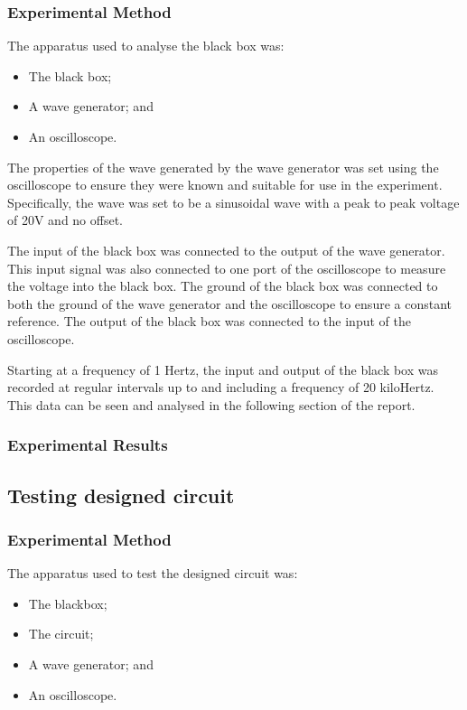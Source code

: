 \documentclass[12pt]{article} %
\begin{document}
\subsubsection{Experimental Method}

The apparatus used to analyse the black box was:
\begin{itemize} \itemsep1pt
	\item The black box;
	\item A wave generator; and
	\item An oscilloscope.
\end{itemize}


The properties of the wave generated by the wave generator was set using the oscilloscope to ensure they were known and suitable for use in the experiment. Specifically, the wave was set to be a sinusoidal wave with a peak to peak voltage of 20V and no offset.

The input of the black box was connected to the output of the wave generator. This input signal was also connected to one port of the oscilloscope to measure the voltage into the black box. The ground of the black box was connected to both the ground of the wave generator and the oscilloscope to ensure a constant reference. The output of the black box was connected to the input of the oscilloscope. 

Starting at a frequency of 1 Hertz, the input and output of the black box was recorded at regular intervals up to and including a frequency of 20 kiloHertz. This data can be seen and analysed in the following section of the report.

\subsubsection{Experimental Results}



\pagebreak

\subsection{Testing designed circuit}

\subsubsection{Experimental Method}

The apparatus used to test the designed circuit was:
\begin{itemize} \itemsep1pt
	\item The blackbox;
	\item The circuit;
	\item A wave generator; and
	\item An oscilloscope.
\end{itemize}
\end{document}
